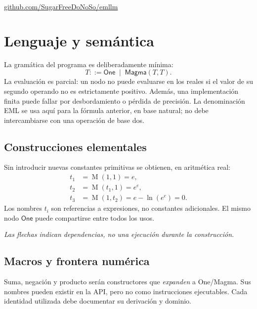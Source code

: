 \documentclass[11pt,a4paper]{article}
\newcommand{\M}{\operatorname{M}}
\newcommand{\One}{\mathsf{One}}
\newcommand{\Magma}{\mathsf{Magma}}
\begin{document}
\vfill
\href{https://github.com/SugarFreeDoNoSo/emllm}{github.com/SugarFreeDoNoSo/emllm}
\newpage

\section{Lenguaje y semántica}
La gramática del programa es deliberadamente mínima:
\[
 T ::= \One\;\mid\;\Magma(T,T).
\]
La evaluación es parcial: un nodo no puede evaluarse en los reales si el
valor de su segundo operando no es estrictamente positivo. Además, una
implementación finita puede fallar por desbordamiento o pérdida de precisión.
La denominación EML se usa aquí para la fórmula anterior, en base natural;
no debe intercambiarse con una operación de base dos.

\subsection{Construcciones elementales}
Sin introducir nuevas constantes primitivas se obtienen, en aritmética real:
\begin{align*}
 t_1 &= \M(1,1)=e,\\
 t_2 &= \M(t_1,1)=e^e,\\
 t_3 &= \M(1,t_2)=e-\ln(e^e)=0.
\end{align*}
Los nombres \(t_i\) son referencias a expresiones, no constantes adicionales.
El mismo nodo \(\One\) puede compartirse entre todos los usos.

\begin{center}
\end{center}
\textit{Las flechas indican dependencias, no una ejecución durante la construcción.}

\subsection{Macros y frontera numérica}
Suma, negación y producto serán constructores que \emph{expanden} a One/Magma.
Sus nombres pueden existir en la API, pero no como instrucciones ejecutables.
Cada identidad utilizada debe documentar su derivación y dominio.
\end{document}
